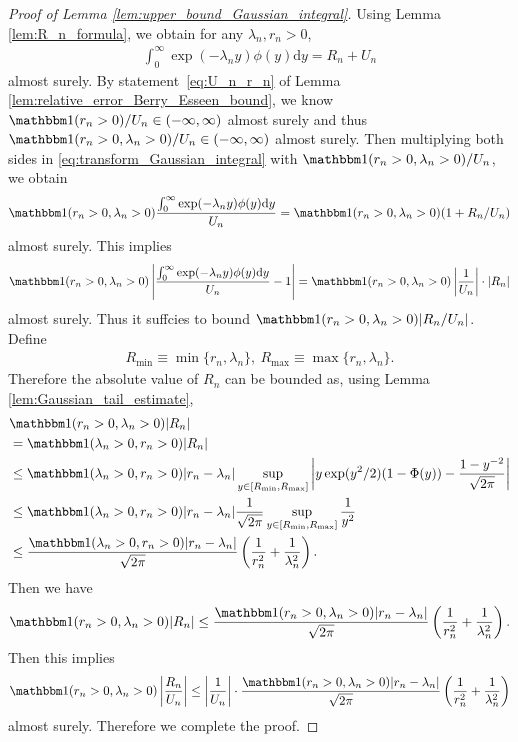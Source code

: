 \documentclass[12pt]{article}
\theoremstyle{definition}
\newcommand{\indicator}{\mathbbm 1}						%
\begin{document}
	\begin{proof}[Proof of Lemma \ref{lem:upper_bound_Gaussian_integral}]
		Using Lemma \ref{lem:R_n_formula}, we obtain for any $\lambda_n,r_n>0$,
		\begin{align}\label{eq:transform_Gaussian_integral}
			\int_{0}^{\infty}\exp(-\lambda_n y)\phi(y)\mathrm{d}y =R_n+U_n
		\end{align}
		almost surely. By statement~\eqref{eq:U_n_r_n} of Lemma \ref{lem:relative_error_Berry_Esseen_bound}, we know $\indicator(r_n>0)/U_n\in (-\infty,\infty)$ almost surely and thus $\indicator(r_n>0,\lambda_n>0)/U_n\in (-\infty,\infty)$ almost surely. Then multiplying both sides in \eqref{eq:transform_Gaussian_integral} with $\indicator(r_n>0,\lambda_n>0)/U_n$, we obtain
		\begin{align*}
			\indicator(r_n>0,\lambda_n>0)\frac{\int_{0}^{\infty}\exp(-\lambda_n y)\phi(y)\mathrm{d}y}{U_n}=
			\indicator(r_n>0,\lambda_n>0)(1+R_n/U_n)
		\end{align*}
		almost surely. This implies 
		\begin{align*}
			\indicator(r_n>0,\lambda_n>0)\left|\frac{\int_{0}^{\infty}\exp(-\lambda_n y)\phi(y)\mathrm{d}y}{U_n}-1\right|
			=\indicator(r_n>0,\lambda_n>0)\left|\frac{1}{U_n}\right|\cdot |R_n|
		\end{align*}
		almost surely. Thus it suffcies to bound $\indicator(r_n>0,\lambda_n>0)|R_n/U_n|$.
		Define 
		\begin{align*}
			R_{\min}\equiv \min\{r_n,\lambda_n\},\ R_{\max}\equiv \max\{r_n,\lambda_n\}.
		\end{align*}
	Therefore the absolute value of $R_n$ can be bounded as, using Lemma \ref{lem:Gaussian_tail_estimate},
	\begin{align*}
		&
		\indicator(r_n>0,\lambda_n>0)|R_n|\\
		&
		=\indicator(\lambda_n>0,r_n>0)|R_n|\\
		&
		\leq\indicator(\lambda_n>0,r_n>0)|r_n-\lambda_n|\sup_{y\in [R_{\min},R_{\max}]}\left|y\exp(y^2/2)(1-\Phi(y))-\frac{1-y^{-2}}{\sqrt{2\pi}}\right|\\
		&
		\leq \indicator(\lambda_n>0,r_n>0)|r_n-\lambda_n|\frac{1}{\sqrt{2\pi}}\sup_{y\in [R_{\min},R_{\max}]}\frac{1}{y^2}\\
		&
		\leq \frac{\indicator(\lambda_n>0,r_n>0)|r_n-\lambda_n|}{\sqrt{2\pi}}\left(\frac{1}{r_n^2}+\frac{1}{\lambda_n^2}\right).
	\end{align*}
	Then we have 
	\begin{align*}
		\indicator(r_n>0,\lambda_n>0)|R_n|\leq \frac{\indicator(r_n>0,\lambda_n>0)|r_n-\lambda_n|}{\sqrt{2\pi}}\left(\frac{1}{r_n^2}+\frac{1}{\lambda_n^2}\right).
	\end{align*}
	Then this implies
	\begin{align*}
		\indicator(r_n>0,\lambda_n>0)\left|\frac{R_n}{U_n}\right|\leq \left|\frac{1}{U_n}\right|\cdot \frac{\indicator(r_n>0,\lambda_n>0)|r_n-\lambda_n|}{\sqrt{2\pi}}\left(\frac{1}{r_n^2}+\frac{1}{\lambda_n^2}\right)
	\end{align*}
	almost surely. Therefore we complete the proof.
	\end{proof}
\end{document}
